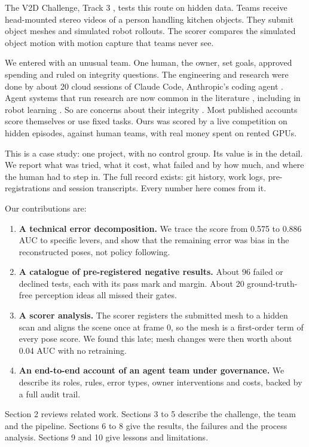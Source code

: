 \documentclass[11pt]{article}
\begin{document}
The V2D Challenge, Track 3 \cite{r7}, tests this route on hidden data. Teams receive head-mounted stereo videos of a person handling kitchen objects. They submit object meshes and simulated robot rollouts. The scorer compares the simulated object motion with motion capture that teams never see.

We entered with an unusual team. One human, the owner, set goals, approved spending and ruled on integrity questions. The engineering and research were done by about 20 cloud sessions of Claude Code, Anthropic's coding agent \cite{r8}. Agent systems that run research are now common in the literature \cite{r9,r10}, including in robot learning \cite{r11,r12}. So are concerns about their integrity \cite{r13,r14}. Most published accounts score themselves or use fixed tasks. Ours was scored by a live competition on hidden episodes, against human teams, with real money spent on rented GPUs.

This is a case study: one project, with no control group. Its value is in the detail. We report what was tried, what it cost, what failed and by how much, and where the human had to step in. The full record exists: git history, work logs, pre-registrations and session transcripts. Every number here comes from it.

Our contributions are:

\begin{enumerate}[itemsep=2pt,topsep=3pt]
\item \textbf{A technical error decomposition.} We trace the score from 0.575 to 0.886 AUC to specific levers, and show that the remaining error was bias in the reconstructed poses, not policy following.
\item \textbf{A catalogue of pre-registered negative results.} About 96 failed or declined tests, each with its pass mark and margin. About 20 ground-truth-free perception ideas all missed their gates.
\item \textbf{A scorer analysis.} The scorer registers the submitted mesh to a hidden scan and aligns the scene once at frame 0, so the mesh is a first-order term of every pose score. We found this late; mesh changes were then worth about 0.04 AUC with no retraining.
\item \textbf{An end-to-end account of an agent team under governance.} We describe its roles, rules, error types, owner interventions and costs, backed by a full audit trail.
\end{enumerate}
Section 2 reviews related work. Sections 3 to 5 describe the challenge, the team and the pipeline. Sections 6 to 8 give the results, the failures and the process analysis. Sections 9 and 10 give lessons and limitations.
\end{document}
